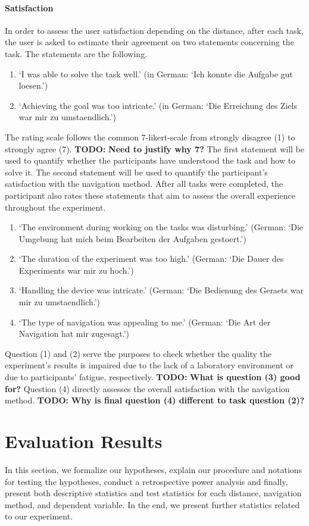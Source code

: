 \documentclass{sig-alternate-05-2015}
\newcommand{\todo}{\textbf{TODO:} \textbf}
\begin{document}
\paragraph{Satisfaction}
In order to assess the user satisfaction depending on the distance, after each task, the user is asked to estimate their
agreement on two statements concerning the task. The statements are the following.
\begin{enumerate}
  \item `I was able to solve the task well.' (in German: `Ich konnte die Aufgabe gut loesen.')
  \item `Achieving the goal was too intricate.' (in German: `Die Erreichung des Ziels war mir zu umstaendlich.')
\end{enumerate}
The rating scale follows the common 7-likert-scale from strongly disagree (1) to strongly agree (7). \todo{Need to justify why 7?}
The first statement will be used to quantify whether the participants have understood the task and how to solve it. The second statement will
be used to quantify the participant's satisfaction with the navigation method.
After all tasks were completed, the participant also rates these statements that aim to assess the overall experience throughout the experiment.
\begin{enumerate}
  \item `The environment during working on the tasks was disturbing.' (German: `Die Umgebung hat mich beim Bearbeiten der Aufgaben gestoert.')
  \item `The duration of the experiment was too high.' (German: `Die Dauer des Experiments war mir zu hoch.')
  \item `Handling the device was intricate.' (German: `Die Bedienung des Geraets war mir zu umstaendlich.')
  \item `The type of navigation was appealing to me.' (German: `Die Art der Navigation hat mir zugesagt.')
\end{enumerate}
Question (1) and (2) serve the purposes to check whether the quality the experiment's results is impaired due to the lack of a laboratory environment or
due to participants' fatigue, respectively. \todo{What is question (3) good for?} Question (4) directly assesses the overall satisfaction with the navigation method.
\todo{Why is final question (4) different to task question (2)?}
\section{Evaluation Results}
In this section, we formalize our hypotheses, explain our procedure and notations for testing the hypotheses, conduct a retrospective power analysis and finally, present both descriptive statistics
and test statistics for each distance, navigation method, and dependent variable. In the end, we present further statistics related to our experiment.
\end{document}
